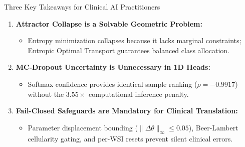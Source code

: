 \documentclass[aspectratio=169,10pt]{beamer}
\begin{document}
\begin{frame}{Three Key Takeaways for Clinical AI Practitioners}
    \vspace{0.2cm}
    \begin{enumerate}
        \setlength{\itemsep}{1.2em}
        \item \textbf{\large Attractor Collapse is a Solvable Geometric Problem:}
        \begin{itemize}
            \item Entropy minimization collapses because it lacks marginal constraints; Entropic Optimal Transport guarantees balanced class allocation.
        \end{itemize}
        
        \item \textbf{\large MC-Dropout Uncertainty is Unnecessary in 1D Heads:}
        \begin{itemize}
            \item Softmax confidence provides identical sample ranking ($\rho = -0.9917$) without the $3.55\times$ computational inference penalty.
        \end{itemize}

        \item \textbf{\large Fail-Closed Safeguards are Mandatory for Clinical Translation:}
        \begin{itemize}
            \item Parameter displacement bounding ($\|\Delta\theta\|_\infty \le 0.05$), Beer-Lambert cellularity gating, and per-WSI resets prevent silent clinical errors.
        \end{itemize}
    \end{enumerate}
\end{frame}
\end{document}
